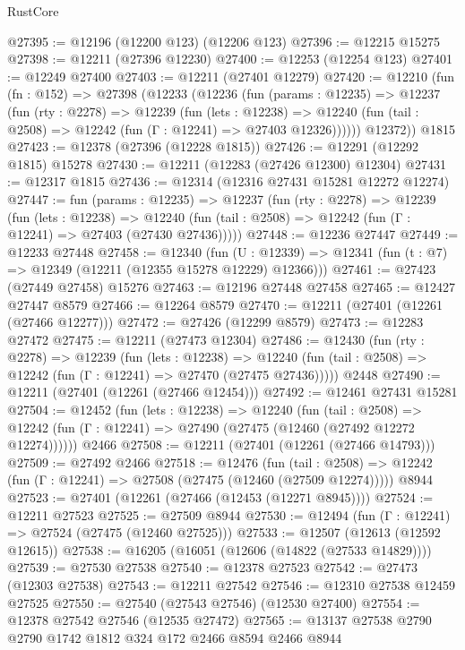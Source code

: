 \begin{lexlean}{RustCore}
\begin{coremodule}
@27395 := @12196 (@12200 @123) (@12206 @123)
@27396 := @12215 @15275
@27398 := @12211 (@27396 @12230)
@27400 := @12253 (@12254 @123)
@27401 := @12249 @27400
@27403 := @12211 (@27401 @12279)
@27420 := @12210
    (fun (fn : @152) =>
    @27398
      (@12233
        (@12236
          (fun (params : @12235) =>
          @12237
            (fun (rty : @2278) =>
            @12239
              (fun (lets : @12238) =>
              @12240 (fun (tail : @2508) => @12242 (fun (Γ : @12241) => @27403 @12326))))))
        @12372))
    @1815
@27423 := @12378 (@27396 (@12228 @1815))
@27426 := @12291 (@12292 @1815) @15278
@27430 := @12211 (@12283 (@27426 @12300) @12304)
@27431 := @12317 @1815
@27436 := @12314 (@12316 @27431 @15281 @12272 @12274)
@27447 := fun (params : @12235) =>
  @12237
    (fun (rty : @2278) =>
    @12239
      (fun (lets : @12238) =>
      @12240 (fun (tail : @2508) => @12242 (fun (Γ : @12241) => @27403 (@27430 @27436)))))
@27448 := @12236 @27447
@27449 := @12233 @27448
@27458 := @12340
    (fun (U : @12339) => @12341 (fun (t : @7) => @12349 (@12211 (@12355 @15278 @12229) @12366)))
@27461 := @27423 (@27449 @27458) @15276
@27463 := @12196 @27448 @27458
@27465 := @12427 @27447 @8579
@27466 := @12264 @8579
@27470 := @12211 (@27401 (@12261 (@27466 @12277)))
@27472 := @27426 (@12299 @8579)
@27473 := @12283 @27472
@27475 := @12211 (@27473 @12304)
@27486 := @12430
    (fun (rty : @2278) =>
    @12239
      (fun (lets : @12238) =>
      @12240 (fun (tail : @2508) => @12242 (fun (Γ : @12241) => @27470 (@27475 @27436)))))
    @2448
@27490 := @12211 (@27401 (@12261 (@27466 @12454)))
@27492 := @12461 @27431 @15281
@27504 := @12452
    (fun (lets : @12238) =>
    @12240
      (fun (tail : @2508) =>
      @12242 (fun (Γ : @12241) => @27490 (@27475 (@12460 (@27492 @12272 @12274))))))
    @2466
@27508 := @12211 (@27401 (@12261 (@27466 @14793)))
@27509 := @27492 @2466
@27518 := @12476
    (fun (tail : @2508) => @12242 (fun (Γ : @12241) => @27508 (@27475 (@12460 (@27509 @12274)))))
    @8944
@27523 := @27401 (@12261 (@27466 (@12453 (@12271 @8945))))
@27524 := @12211 @27523
@27525 := @27509 @8944
@27530 := @12494 (fun (Γ : @12241) => @27524 (@27475 (@12460 @27525)))
@27533 := @12507 (@12613 (@12592 @12615))
@27538 := @16205 (@16051 (@12606 (@14822 (@27533 @14829))))
@27539 := @27530 @27538
@27540 := @12378 @27523
@27542 := @27473 (@12303 @27538)
@27543 := @12211 @27542
@27546 := @12310 @27538 @12459 @27525
@27550 := @27540 (@27543 @27546) (@12530 @27400)
@27554 := @12378 @27542 @27546 (@12535 @27472)
@27565 := @13137 @27538 @2790 @2790 @1742 @1812 @324 @172 @2466 @8594 @2466 @8944

\end{coremodule}
\end{lexlean}

